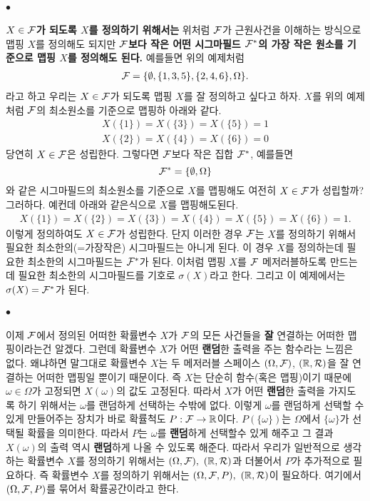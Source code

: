 \documentclass[12pt,oneside,english,a4paper]{article}
\def\ck{\paragraph{\Large$\bullet$}\Large}
\begin{document}
\ck \textbf{$X \in {\cal F}$가 되도록 $X$를 정의하기 위해서는} 위처럼 ${\cal F}$가 근원사건을 이해하는 방식으로 맵핑 $X$를 정의해도 되지만 \textbf{${\cal F}$보다 작은 어떤 시그마필드 ${\cal F}^* $의 가장 작은 원소를 기준으로 맵핑 $X$를 정의해도 된다.} 예를들면 위의 예제처럼 
\begin{align*}
{\cal F}=\{\emptyset, \{1,3,5\}, \{2,4,6\},\Omega \}.
\end{align*}
라고 하고 우리는 $X \in {\cal F}$가 되도록 맵핑 $X$를 잘 정의하고 싶다고 하자. $X$를 위의 예제처럼 ${\cal F}$의 최소원소를 기준으로 맵핑하 아래와 같다. 
\begin{align*}
X(\{1\})=X(\{3\})=X(\{5\})=1 
\end{align*}
\begin{align*}
X(\{2\})=X(\{4\})=X(\{6\})=0
\end{align*}
당연히 $X \in {\cal F}$은 성립한다. 그렇다면 ${\cal F}$보다 작은 집합 ${\cal F}^* $, 예를들면 
\[
{\cal F}^* = \{\emptyset, \Omega\}
\]
와 같은 시그마필드의 최소원소를 기준으로 $X$를 맵핑해도 여전히 $X\in {\cal F}$가 성립할까? 그러하다. 예컨데 아래와 같은식으로 $X$를 맵핑해도된다. 
\begin{align*}
X(\{1\})=X(\{2\})=X(\{3\})=X(\{4\})=X(\{5\})=X(\{6\})=1.
\end{align*}
이렇게 정의하여도 $X \in {\cal F}$가 성립한다. 단지 이러한 경우 ${\cal F}$는 $X$를 정의하기 위해서 필요한 최소한의(=가장작은) 시그마필드는 아니게 된다. 이 경우 $X$를 정의하는데 필요한 최소한의 시그마필드는 ${\cal F}^* $가 된다. 이처럼 맵핑 $X$를 ${\cal F}$ 메저러블하도록 만드는데 필요한 최소한의 시그마필드를 기호로 $\sigma(X)$라고 한다. 그리고 이 예제에서는 $\sigma(X)={\cal F}^* $가 된다. 

\ck 이제 $\cal F$에서 정의된 어떠한 확률변수 $X$가 $\cal F$의 모든 사건들을 \textbf{잘} 연결하는 어떠한 맵핑이라는건 알겠다. 그런데 확률변수 $X$가 어떤 \textbf{랜덤}한 출력을 주는 함수라는 느낌은 없다. 왜냐하면 말그대로 확률변수 $X$는 두 메저러블 스페이스 $(\Omega, {\cal F})$, $(\mathbb{R},{\cal R})$을 잘 연결하는 어떠한 맵핑일 뿐이기 때문이다. 즉 $X$는 단순히 함수(혹은 맵핑)이기 때문에 $\omega \in \Omega$가 고정되면 $X(\omega)$의 값도 고정된다. 따라서 $X$가 어떤 \textbf{랜덤}한 출력을 가지도록 하기 위해서는 $\omega$를 랜덤하게 선택하는 수밖에 없다. 이렇게 $\omega$를 랜덤하게 선택할 수 있게 만들어주는 장치가 바로 확률척도 $P:{\cal F} \rightarrow \mathbb{R}$이다. $P(\{\omega\})$는 $\Omega$에서 $\{\omega\}$가 선택될 확률을 의미한다. 따라서 $P$는 $\omega$를 \textbf{랜덤}하게 선택할수 있게 해주고 그 결과 $X(\omega)$의 출력 역시 \textbf{랜덤}하게 나올 수 있도록 해준다. 따라서 우리가 일반적으로 생각하는 확률변수 $X$를 정의하기 위해서는 $(\Omega, {\cal F}), ~ (\mathbb{R},{\cal R})$과 더불어서 $P$가 추가적으로 필요하다. 즉 확률변수 $X$를 정의하기 위해서는 $(\Omega,{\cal F},P), ~ (\mathbb{R},{\cal R})$이 필요하다. 여기에서 $(\Omega, {\cal F}, P)$를 묶어서 확률공간이라고 한다. 
\end{document}
